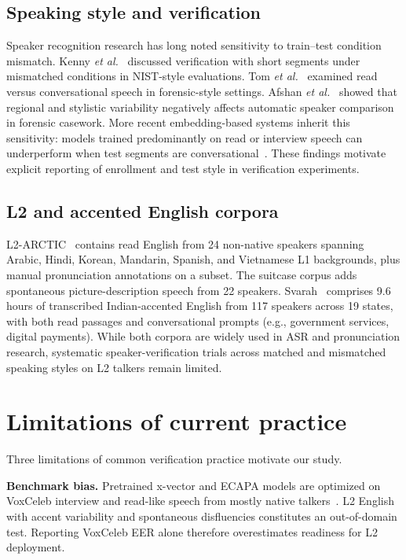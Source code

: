 \documentclass[cameraready]{Interspeech}
\begin{document}
\subsection{Speaking style and verification}

Speaker recognition research has long noted sensitivity to train--test condition mismatch. Kenny \textit{et al.}~\cite{kenny2014style} discussed verification with short segments under mismatched conditions in NIST-style evaluations. Tom \textit{et al.}~\cite{tom2010style} examined read versus conversational speech in forensic-style settings. Afshan \textit{et al.}~\cite{afshan2015style} showed that regional and stylistic variability negatively affects automatic speaker comparison in forensic casework. More recent embedding-based systems inherit this sensitivity: models trained predominantly on read or interview speech can underperform when test segments are conversational~\cite{wang2020crossstyle}. These findings motivate explicit reporting of enrollment and test style in verification experiments.

\subsection{L2 and accented English corpora}

L2-ARCTIC~\cite{zhao2018l2arctic} contains read English from 24 non-native speakers spanning Arabic, Hindi, Korean, Mandarin, Spanish, and Vietnamese L1 backgrounds, plus manual pronunciation annotations on a subset. The suitcase corpus adds spontaneous picture-description speech from 22 speakers. Svarah~\cite{javed2023svarah} comprises 9.6 hours of transcribed Indian-accented English from 117 speakers across 19 states, with both read passages and conversational prompts (e.g., government services, digital payments). While both corpora are widely used in ASR and pronunciation research, systematic speaker-verification trials across matched and mismatched speaking styles on L2 talkers remain limited.

\section{Limitations of current practice}
\label{sec:pitfalls}

Three limitations of common verification practice motivate our study.

\textbf{Benchmark bias.} Pretrained x-vector and ECAPA models are optimized on VoxCeleb interview and read-like speech from mostly native talkers~\cite{chung2018voxceleb,desplanques2020ecapa}. L2 English with accent variability and spontaneous disfluencies constitutes an out-of-domain test. Reporting VoxCeleb EER alone therefore overestimates readiness for L2 deployment.
\end{document}
